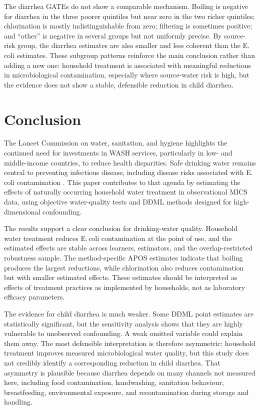 \documentclass [11pt]{article}
\theoremstyle{plain}
\theoremstyle{definition}
\theoremstyle{remark}
\newcommand{\1}{\bm{1}}
\begin{document}
The diarrhea GATEs do not show a comparable mechanism. Boiling is negative for diarrhea in the three poorer quintiles but near zero in the two richer quintiles; chlorination is mostly indistinguishable from zero; filtering is sometimes positive; and ``other'' is negative in several groups but not uniformly precise. By source-risk group, the diarrhea estimates are also smaller and less coherent than the E.\,coli estimates. These subgroup patterns reinforce the main conclusion rather than adding a new one: household treatment is associated with meaningful reductions in microbiological contamination, especially where source-water risk is high, but the evidence does not show a stable, defensible reduction in child diarrhea.




\section{Conclusion}  

The Lancet Commission on water, sanitation, and hygiene highlights the continued need for investments in WASH services, particularly in low- and middle-income countries, to reduce health disparities. Safe drinking water remains central to preventing infectious disease, including disease risks associated with E.\,coli contamination \cite{lancet2021commission}. This paper contributes to that agenda by estimating the effects of naturally occurring household water treatment in observational MICS data, using objective water-quality tests and DDML methods designed for high-dimensional confounding.

The results support a clear conclusion for drinking-water quality. Household water treatment reduces E.\,coli contamination at the point of use, and the estimated effects are stable across learners, estimators, and the overlap-restricted robustness sample. The method-specific APOS estimates indicate that boiling produces the largest reductions, while chlorination also reduces contamination but with smaller estimated effects. These estimates should be interpreted as effects of treatment practices as implemented by households, not as laboratory efficacy parameters.

The evidence for child diarrhea is much weaker. Some DDML point estimates are statistically significant, but the sensitivity analysis shows that they are highly vulnerable to unobserved confounding. A weak omitted variable could explain them away. The most defensible interpretation is therefore asymmetric: household treatment improves measured microbiological water quality, but this study does not credibly identify a corresponding reduction in child diarrhea. That asymmetry is plausible because diarrhea depends on many channels not measured here, including food contamination, handwashing, sanitation behaviour, breastfeeding, environmental exposure, and recontamination during storage and handling.
\end{document}
